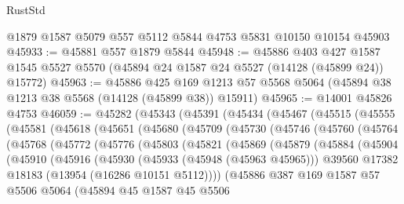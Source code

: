 \begin{lexlean}{RustStd}
\begin{coremodule}
    @1879
    @1587
    @5079
    @557
    @5112
    @5844
    @4753
    @5831
    @10150
    @10154
    @45903
@45933 := @45881 @557 @1879 @5844
@45948 := @45886
    @403
    @427
    @1587
    @1545
    @5527
    @5570
    (@45894 @24 @1587 @24 @5527 (@14128 (@45899 @24)) @15772)
@45963 := @45886
    @425
    @169
    @1213
    @57
    @5568
    @5064
    (@45894 @38 @1213 @38 @5568 (@14128 (@45899 @38)) @15911)
@45965 := @14001 @45826 @4753
@46059 := @45282
    (@45343
      (@45391
        (@45434
          (@45467
            (@45515
              (@45555
                (@45581
                  (@45618
                    (@45651
                      (@45680
                        (@45709
                          (@45730
                            (@45746
                              (@45760
                                (@45764
                                  (@45768
                                    (@45772
                                      (@45776
                                        (@45803
                                          (@45821
                                            (@45869
                                              (@45879
                                                (@45884
                                                  (@45904
                                                    (@45910
                                                      (@45916
                                                        (@45930
                                                          (@45933 (@45948 (@45963 @45965)))
                                                          @39560
                                                          @17382
                                                          @18183
                                                          (@13954 (@16286 @10151 @5112))))
                                                      (@45886
                                                        @387
                                                        @169
                                                        @1587
                                                        @57
                                                        @5506
                                                        @5064
                                                        (@45894
                                                          @45
                                                          @1587
                                                          @45
                                                          @5506

\end{coremodule}
\end{lexlean}
